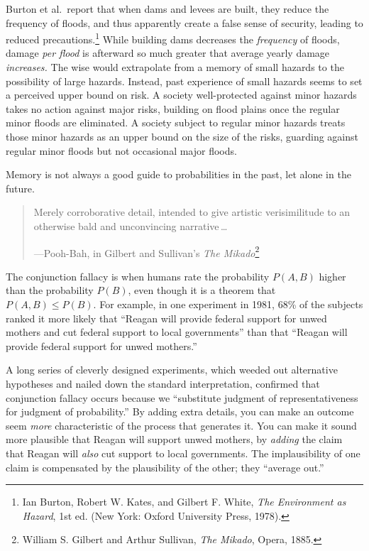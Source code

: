 {
 Burton et al.~report that when dams and levees are built, they
reduce the frequency of floods, and thus apparently create a false
sense of security, leading to reduced precautions.\footnote{Ian Burton, Robert W. Kates, and Gilbert F. White, \textit{The
Environment as Hazard}, 1st ed. (New York: Oxford University Press,
1978).}
While building dams decreases the \textit{frequency} of floods, damage
\textit{per flood} is afterward so much greater that average yearly
damage \textit{increases.} The wise would extrapolate from a memory of
small hazards to the possibility of large hazards. Instead, past
experience of small hazards seems to set a perceived upper bound on
risk. A society well-protected against minor hazards takes no action
against major risks, building on flood plains once the regular minor
floods are eliminated. A society subject to regular minor hazards
treats those minor hazards as an upper bound on the size of the risks,
guarding against regular minor floods but not occasional major floods.}

{
 Memory is not always a good guide to probabilities in the past,
let alone in the future.}

\myendsectiontext


\bigskip

\label{burdensome_details}

\begin{quote}
{
 Merely corroborative detail, intended to give artistic
verisimilitude to an otherwise bald and unconvincing narrative\,\ldots}

{\raggedleft
 {}---Pooh-Bah, in Gilbert and Sullivan's
\textit{The Mikado}\footnote{William S. Gilbert and Arthur Sullivan, \textit{The Mikado},
Opera, 1885.}
\par}
\end{quote}


{
 The conjunction fallacy is when humans rate the probability $P(A,B)$
higher than the probability $P(B)$, even though it is a theorem that
$P(A,B) \leq P(B)$. For example, in one experiment in 1981, 68\% of
the subjects ranked it more likely that ``Reagan will
provide federal support for unwed mothers and cut federal support to
local governments'' than that
``Reagan will provide federal support for unwed
mothers.''}

{
 A long series of cleverly designed experiments, which weeded out
alternative hypotheses and nailed down the standard interpretation,
confirmed that conjunction fallacy occurs because we
``substitute judgment of representativeness for
judgment of probability.'' By adding extra details,
you can make an outcome seem \textit{more} characteristic of the
process that generates it. You can make it sound more plausible that
Reagan will support unwed mothers, by \textit{adding} the claim that
Reagan will \textit{also} cut support to local governments. The
implausibility of one claim is compensated by the plausibility of the
other; they ``average out.''}

